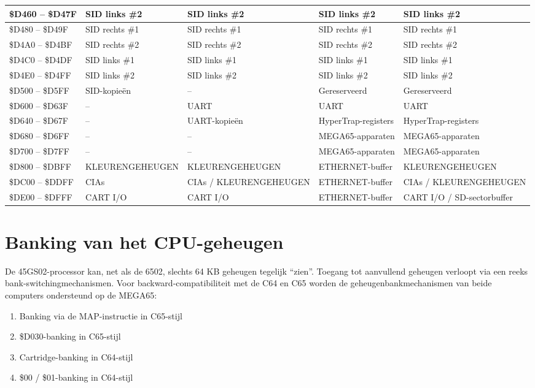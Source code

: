 \begin{longtable}{|p{2.2cm}|C{2cm}|C{2cm}|C{2cm}|C{2cm}|}
\hline
\small \$D460 -- \$D47F & \small SID links \#2 & SID links \#2 & SID links \#2 &SID links \#2 \\
\hline
\small \$D480 -- \$D49F & \small SID rechts \#1 & SID rechts \#1 & SID rechts \#1 &SID rechts \#1 \\
\hline
\small \$D4A0 -- \$D4BF & \small SID rechts \#2 & SID rechts \#2 & SID rechts \#2 &SID rechts \#2 \\
\hline
\small \$D4C0 -- \$D4DF & \small SID links \#1 & SID links \#1 & SID links \#1 &SID links \#1 \\
\hline
\small \$D4E0 -- \$D4FF & \small SID links \#2 & SID links \#2 & SID links \#2 &SID links \#2 \\
\hline
\small \$D500 -- \$D5FF & \small SID-kopieën & -- & Gereserveerd & Gereserveerd \\
\hline
\small \$D600 -- \$D63F & \small -- & UART & UART & UART \\
\hline
\small \$D640 -- \$D67F & \small -- & UART-kopieën & HyperTrap-registers & HyperTrap-registers \\
\hline
\small \$D680 -- \$D6FF & \small -- & -- & MEGA65-apparaten & MEGA65-apparaten \\
\hline
\small \$D700 -- \$D7FF & \small -- & -- & MEGA65-apparaten & MEGA65-apparaten \\
\hline
\small \$D800 -- \$DBFF & \small KLEURENGEHEUGEN & KLEURENGEHEUGEN & ETHERNET-buffer & KLEURENGEHEUGEN \\
\hline
\small \$DC00 -- \$DDFF & \small CIAs & CIAs / KLEURENGEHEUGEN & ETHERNET-buffer & CIAs / KLEURENGEHEUGEN \\
\hline
\small \$DE00 -- \$DFFF & \small CART I/O & CART I/O & ETHERNET-buffer & CART I/O / SD-sectorbuffer \\
\hline
\end{longtable}

\section{Banking van het CPU-geheugen}
\label{sec:membanking}

De 45GS02-processor kan, net als de 6502, slechts 64 KB geheugen tegelijk ``zien''. Toegang tot aanvullend geheugen verloopt via een reeks bank-switchingmechanismen. Voor backward-compatibiliteit met de C64 en C65 worden de geheugenbankmechanismen van beide computers ondersteund op de MEGA65:
\begin{enumerate}
\item Banking via de MAP-instructie in C65-stijl
\item \$D030-banking in C65-stijl
\item Cartridge-banking in C64-stijl
\item \$00 / \$01-banking in C64-stijl
\end{enumerate}

